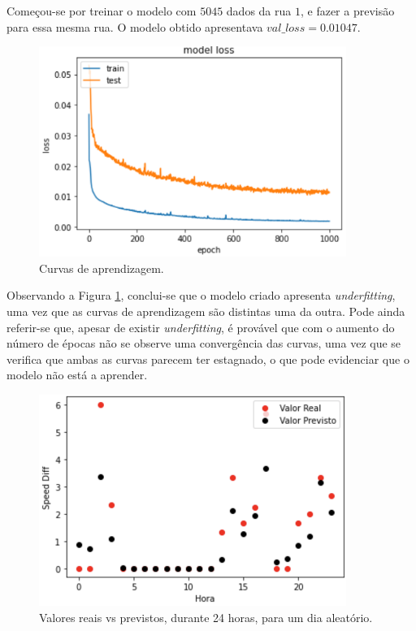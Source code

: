 \documentclass[a4paper, 12pt]{article}
\begin{document}
Começou-se por treinar o modelo com $5045$ dados da rua $1$, e fazer a previsão para essa mesma rua. O modelo obtido apresentava $val\_loss=0.01047$.

\begin{figure}[H]
	\centering
	\includegraphics[width=10cm]{resultados/curvas_aprend_1.png}
	\caption{Curvas de aprendizagem.}
	\label{figure:curvas_aprend_1}
\end{figure}

Observando a Figura \ref{figure:curvas_aprend_1}, conclui-se que o modelo criado apresenta \textit{underfitting}, uma vez que as curvas de aprendizagem são distintas uma da outra. Pode ainda referir-se que, apesar de existir \textit{underfitting}, é provável que com o aumento do número de épocas não se observe uma convergência das curvas, uma vez que se verifica que ambas as curvas parecem ter estagnado, o que pode evidenciar que o modelo não está a aprender.

\begin{figure}[H]
	\centering
	\includegraphics[width=10cm]{resultados/real_prev_1.png}
	\caption{Valores reais vs previstos, durante 24 horas, para um dia aleatório.}
	\label{figure:real_prev_1}
\end{figure}
\end{document}
